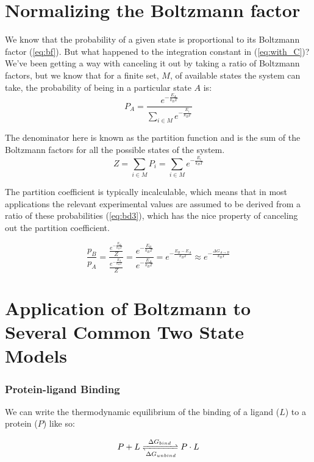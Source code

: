 \section{Normalizing the Boltzmann factor}

We know that the probability of a given state is proportional to its Boltzmann factor (\ref{eq:bf}).
But what happened to the integration constant in (\ref{eq:with_C})?
We've been getting a way with canceling it out by taking a ratio of Boltzmann factors, but we know that for a finite set, $M$, of available states the system can take, the probability of being in a particular state $A$ is:
\begin{equation}
    P_{A} = \frac{e^{-\frac{E_A}{k_BT}}}{\sum_{i \in M} e^{-\frac{E_i}{k_BT}}}
\end{equation}

The denominator here is known as the partition function and is the sum of the Boltzmann factors for all the possible states of the system.
\begin{equation}
    Z = \sum_{i \in M} P_i = \sum_{i \in M} e^{-\frac{E_i}{k_BT}}
\end{equation}

The partition coefficient is typically incalculable, which means that in most applications the relevant experimental values are assumed to be derived from a ratio of these probabilities (\ref{eq:bd3}), which has the nice property of canceling out the partition coefficient.

\begin{equation}
    \frac{p_B}{p_A} = \frac{\frac{e^{-\frac{E_B}{k_BT}}}{Z}}{\frac{e^{-\frac{E_A}{k_BT}}}{Z}}
    = \frac{e^{-\frac{E_B}{k_BT}}}{e^{-\frac{E_A}{k_BT}}}
    = e^{-\frac{E_B - E_A}{k_BT}}
    \approx e^{-\frac{\Delta G_{A\rightarrow B}}{k_BT}} 
    \label{eq:bd3}
\end{equation} 

\section{Application of Boltzmann to Several Common Two State Models}

\subsubsection{Protein-ligand Binding}
We can write the thermodynamic equilibrium of the binding of a ligand ($L$) to a protein ($P$) like so:

\begin{equation}
    P + L \xrightleftharpoons[\Delta G_{unbind}]{\Delta G_{bind}} P \cdot L
\end{equation}

